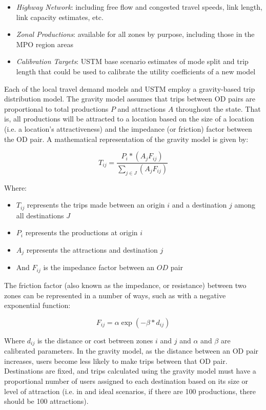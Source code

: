 \begin{itemize}
\def\labelenumi{\arabic{enumi}.}
\item
  \emph{Highway Network}: including free flow and congested travel speeds,
  link length, link capacity estimates, etc.
\item
  \emph{Zonal Productions}: available for all zones by purpose,
  including those in the MPO region areas
\item
  \emph{Calibration Targets}: USTM base scenario estimates of mode split and
  trip length that could be used to calibrate the utility coefficients of a new model
\end{itemize}

Each of the local travel demand models and USTM employ a gravity-based trip
distribution model. The gravity model assumes that trips between OD
pairs are proportional to total productions $P$ and
attractions $A$ throughout the state. That is, all productions will be
attracted to a location based on the size of a location (i.e. a location's
attractiveness) and the impedance (or friction) factor between the OD
pair. A mathematical representation of the gravity model is given by:

\begin{equation}
T_{ij}= \frac{P_i*(A_j F_{ij})}{\sum_{j\in J}(A_j F_{ij})}
 \label{eqn:gravity}
\end{equation}

\noindent Where:
\begin{itemize}
	\item $T_{ij}$ represents the trips made between an origin $i$ and a
  destination $j$ among all destinations $J$
	\item $P_i$ represents the productions at origin $i$
	\item $A_j$ represents the attractions and destination $j$
	\item And $F_{ij}$ is the impedance factor between an $OD$ pair
\end{itemize}

The friction factor (also known as the impedance, or resistance) between two
zones can be represented in a number of ways, such as with a negative
exponential function:

\begin{equation}
	F_{ij} = \alpha \exp(-\beta * d_{ij})
  \label{eqn:fricfac}
\end{equation}

\noindent Where $d_{ij}$ is the distance or cost between zones $i$ and $j$ and $\alpha$
and $\beta$ are calibrated parameters. In the gravity model, as the distance
between an OD pair increases, users become less likely to make trips between
that OD pair. Destinations are fixed, and trips calculated using the
gravity model must have a proportional number of users assigned to each
destination based on its size or level of attraction (i.e. in and ideal
scenarios, if there are 100
productions, there should be 100 attractions).

